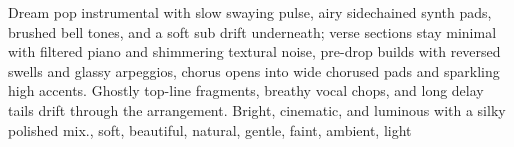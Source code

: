 

\begin{notes}

\end{notes}
\begin{style}
Dream pop instrumental with slow swaying pulse, airy sidechained synth pads, brushed bell tones, and a soft sub drift underneath; verse sections stay minimal with filtered piano and shimmering textural noise, pre-drop builds with reversed swells and glassy arpeggios, chorus opens into wide chorused pads and sparkling high accents. %
Ghostly top-line fragments, breathy vocal chops, and long delay tails drift through the arrangement. %
Bright, cinematic, and luminous with a silky polished mix., soft, beautiful, natural, gentle, faint, ambient, light
\end{style}
